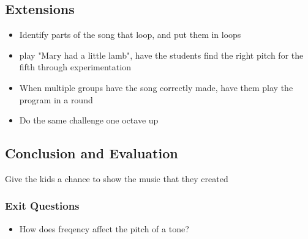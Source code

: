 \documentclass{lessonplan}
\begin{document}
    \subsection{Extensions}
      \begin{itemize}
        \item Identify parts of the song that loop, and put them in
          loops
        \item play "Mary had a little lamb", have the students find
          the right pitch for the fifth through experimentation
        \item When multiple groups have the song correctly made, have
          them play the program in a round
        \item Do the same challenge one octave up
      \end{itemize}
    \subsection{Conclusion and Evaluation}
      Give the kids a chance to show the music that they created
      \subsubsection{Exit Questions}
      \begin{itemize}
        \item How does freqency affect the pitch of a tone?
      \end{itemize}
\end{document}
